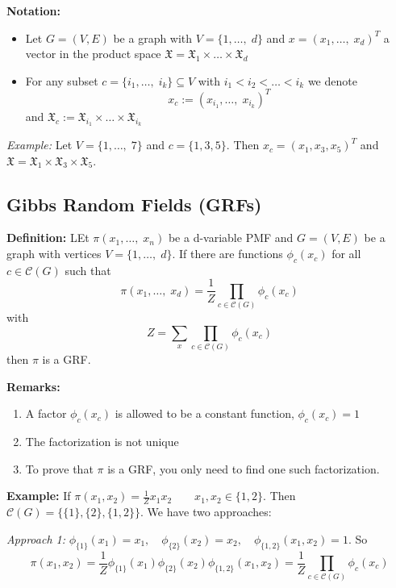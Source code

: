 \documentclass[12pt]{article}
\newcommand{\mfX}{\mathfrak{X}}
\begin{document}
        \textbf{Notation:} 
        \begin{itemize}
            \item Let $G = (V, E)$ be a graph with $V = \{1, \dots,\; d\}$ and $x = (x_1, \dots,\; x_d)^T$ a vector in the product space $\mfX = \mfX_1 \times \dots \times \mfX_d$ 
            \item For any subset $c = \{i_1, \dots,\; i_k\} \subseteq V$ with $i_1 < i_2 < \dots < i_k$ we denote 
            \[x_c := (x_{i_1}, \dots, \; x_{i_k})^T\]
            and $\mfX_c :=\mfX_{i_1} \times \dots \times \mfX_{i_k}$  
        \end{itemize}

        \emph{Example:} Let $V = \{1, \dots,\; 7\}$ and $c = \{1, 3, 5\}$. Then $x_c = (x_1, x_3, x_5)^T$ and $\mfX = \mfX_1 \times \mfX_3 \times \mfX_5$.

    \subsection{Gibbs Random Fields (GRFs)}
        \textbf{Definition:} LEt $\pi(x_1, \dots, \; x_n)$ be a d-variable PMF and $G = (V, E)$ be a graph with vertices $V = \{1, \dots,\; d\}$. If there are functions $\phi_c(x_c)$ for all $c \in \mathcal{C}(G)$ such that 
        \[\pi(x_1, \dots,\; x_d) = \frac{1}{Z}\prod_{c \in \mathcal{C}(G)} \phi_c(x_c)\]
        with 
        \[Z = \sum_x \prod_{c \in \mathcal{C}(G)}\phi_c(x_c)\]
        then $\pi$ is a GRF. 

        \textbf{Remarks:} 
        \begin{enumerate}
            \item A factor $\phi_c(x_c)$ is allowed to be a constant function, $\phi_c(x_c) = 1$
            \item The factorization is not unique 
            \item To prove that $\pi$ is a GRF, you only need to find one such factorization. 
        \end{enumerate}

        \textbf{Example:} If $\pi(x_1, x_2) = \frac{1}{Z}x_1x_2 \qquad x_1, x_2 \in \{1, 2\}$. Then $\mathcal{C}(G) = \{\{1\}, \{2\}, \{1, 2\}\}$. We have two approaches:

        \indent \emph{Approach 1:} $\phi_{\{1\}}(x_1) = x_1, \quad \phi_{\{2\}}(x_2) = x_2, \quad \phi_{\{1, 2\}}(x_1, x_2) = 1$. So 
        \[\pi(x_1, x_2) = \frac{1}{Z}\phi_{\{1\}}(x_1)\phi_{\{2\}}(x_2)\phi_{\{1, 2\}}(x_1, x_2) = \frac{1}{Z}\prod_{c \in \mathcal{C}(G)}\phi_c(x_c)\]
\end{document}
